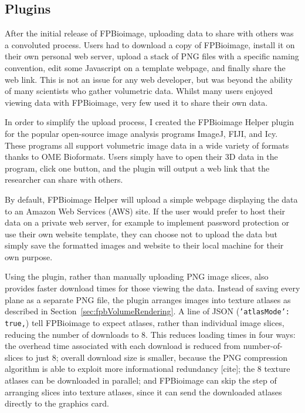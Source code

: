 \subsection{Plugins}
After the initial release of FPBioimage, uploading data to share with others was a convoluted process. 
Users had to download a copy of FPBioimage, install it on their own personal web server, upload a stack of PNG files with a specific naming convention, edit some Javascript on a template webpage, and finally share the web link. 
This is not an issue for any web developer, but was beyond the ability of many scientists who gather volumetric data. 
Whilst many users enjoyed viewing data with FPBioimage, very few used it to share their own data.

In order to simplify the upload process, I created the FPBioimage Helper plugin for the popular open-source image analysis programs ImageJ, FIJI, and Icy. 
These programs all support volumetric image data in a wide variety of formats thanks to OME Bioformats. 
Users simply have to open their 3D data in the program, click one button, and the plugin will output a web link that the researcher can share with others. 

By default, FPBioimage Helper will upload a simple webpage displaying the data to an Amazon Web Services (AWS) site.
If the user would prefer to host their data on a private web server, for example to implement password protection or use their own website template, they can choose not to upload the data but simply save the formatted images and website to their local machine for their own purpose. 

Using the plugin, rather than manually uploading PNG image slices, also provides faster download times for those viewing the data.
Instead of saving every plane as a separate PNG file, the plugin arranges images into texture atlases as described in Section~\ref{sec:fpbVolumeRendering}. 
A line of JSON (\texttt{'atlasMode': true,}) tell FPBioimage to expect atlases, rather than individual image slices, reducing the number of downloads to 8. 
This reduces loading times in four ways: the overhead time associated with each download is reduced from number-of-slices to just 8; overall download size is smaller, because the PNG compression algorithm is able to exploit more informational redundancy [cite]; the 8 texture atlases can be downloaded in parallel; and FPBioimage can skip the step of arranging slices into texture atlases, since it can send the downloaded atlases directly to the graphics card. 

